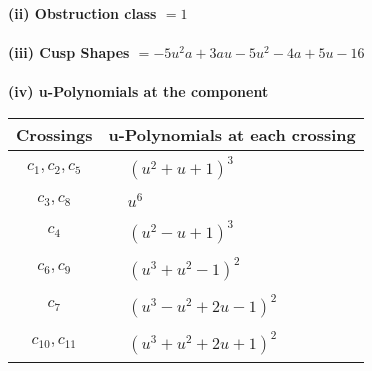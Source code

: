\documentclass[1p]{elsarticle_modified}
\theoremstyle{definition}
\begin{document}
\flushleft \textbf{(ii) Obstruction class $= 1$}\\~\\
\flushleft \textbf{(iii) Cusp Shapes $= -5 u^2 a+3 a u-5 u^2-4 a+5 u-16$}\\~\\
\newpage\renewcommand{\arraystretch}{1}
\flushleft \textbf{(iv) u-Polynomials at the component}\newline \\
\begin{tabular}{m{50pt}|m{274pt}}
Crossings & \hspace{64pt}u-Polynomials at each crossing \\
\hline $$\begin{aligned}c_{1},c_{2},c_{5}\end{aligned}$$&$\begin{aligned}
&(u^2+u+1)^3
\end{aligned}$\\
\hline $$\begin{aligned}c_{3},c_{8}\end{aligned}$$&$\begin{aligned}
&u^6
\end{aligned}$\\
\hline $$\begin{aligned}c_{4}\end{aligned}$$&$\begin{aligned}
&(u^2- u+1)^3
\end{aligned}$\\
\hline $$\begin{aligned}c_{6},c_{9}\end{aligned}$$&$\begin{aligned}
&(u^3+u^2-1)^2
\end{aligned}$\\
\hline $$\begin{aligned}c_{7}\end{aligned}$$&$\begin{aligned}
&(u^3- u^2+2 u-1)^2
\end{aligned}$\\
\hline $$\begin{aligned}c_{10},c_{11}\end{aligned}$$&$\begin{aligned}
&(u^3+u^2+2 u+1)^2
\end{aligned}$\\
\hline
\end{tabular}\\~\\
\end{document}
